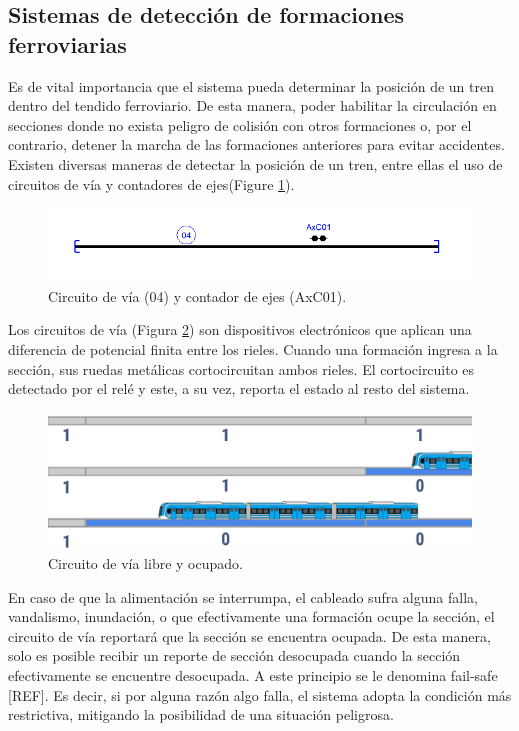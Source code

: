 \subsection{Sistemas de detección de formaciones ferroviarias}

Es de vital importancia que el sistema pueda determinar la posición de un tren dentro del tendido ferroviario. De esta manera, poder habilitar la circulación en secciones donde no exista peligro de colisión con otros formaciones o, por el contrario, detener la marcha de las formaciones anteriores para evitar accidentes. Existen diversas maneras de detectar la posición de un tren, entre ellas el uso de circuitos de vía y contadores de ejes(Figure \ref{fig:deteccion_1}). 

    \begin{figure}[!h]
        \centering
        \includegraphics[width=1\textwidth]{Figuras/Detector.png}
        \centering\caption{Circuito de vía (04) y contador de ejes (AxC01).}
        \label{fig:deteccion_1}
    \end{figure}

Los circuitos de vía (Figura \ref{fig:deteccion_2}) son dispositivos electrónicos que aplican una diferencia de potencial finita entre los rieles. Cuando una formación ingresa a la sección, sus ruedas metálicas cortocircuitan ambos rieles. El cortocircuito es detectado por el relé y este, a su vez, reporta el estado al resto del sistema. 

    \begin{figure}[!h]
        \centering
        \includegraphics[width=1\textwidth]{Figuras/circuito_via}
        \centering\caption{Circuito de vía libre y ocupado.}
        \label{fig:deteccion_2}
    \end{figure}

    En caso de que la alimentación se interrumpa, el cableado sufra alguna falla, vandalismo, inundación, o que efectivamente una formación ocupe la sección, el circuito de vía reportará que la sección se encuentra ocupada. De esta manera, solo es posible recibir un reporte de sección desocupada cuando la sección efectivamente se encuentre desocupada. A este principio se le denomina fail-safe [REF]. Es decir, si por alguna razón algo falla, el sistema adopta la condición más restrictiva, mitigando la posibilidad de una situación peligrosa.

